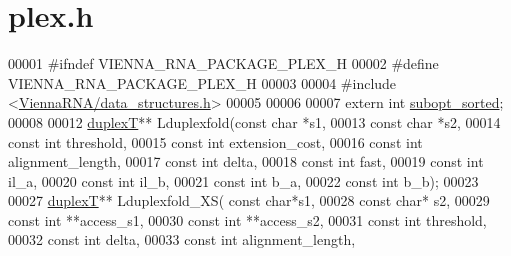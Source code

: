\hypertarget{plex_8h_source}{}\section{plex.\+h}
\label{plex_8h_source}

\begin{DoxyCode}
00001 \textcolor{preprocessor}{#ifndef VIENNA\_RNA\_PACKAGE\_PLEX\_H}
00002 \textcolor{preprocessor}{#define VIENNA\_RNA\_PACKAGE\_PLEX\_H}
00003 
00004 \textcolor{preprocessor}{#include <\hyperlink{data__structures_8h}{ViennaRNA/data\_structures.h}>}
00005 
00006 
00007 \textcolor{keyword}{extern} \textcolor{keywordtype}{int} \hyperlink{group__subopt__wuchty_ga873cf8ed69e0437f8efa8b1fec854a0e}{subopt\_sorted};
00008 
00012 \hyperlink{group__data__structures_structduplexT}{duplexT}** Lduplexfold(\textcolor{keyword}{const} \textcolor{keywordtype}{char} *s1,
00013                       \textcolor{keyword}{const} \textcolor{keywordtype}{char} *s2,
00014                       \textcolor{keyword}{const} \textcolor{keywordtype}{int} threshold,
00015                       \textcolor{keyword}{const} \textcolor{keywordtype}{int} extension\_cost,
00016                       \textcolor{keyword}{const} \textcolor{keywordtype}{int} alignment\_length,
00017                       \textcolor{keyword}{const} \textcolor{keywordtype}{int} delta,
00018                       \textcolor{keyword}{const} \textcolor{keywordtype}{int} fast,
00019                       \textcolor{keyword}{const} \textcolor{keywordtype}{int} il\_a,
00020                       \textcolor{keyword}{const} \textcolor{keywordtype}{int} il\_b,
00021                       \textcolor{keyword}{const} \textcolor{keywordtype}{int} b\_a,
00022                       \textcolor{keyword}{const} \textcolor{keywordtype}{int} b\_b);
00023 
00027 \hyperlink{group__data__structures_structduplexT}{duplexT}** Lduplexfold\_XS( \textcolor{keyword}{const} \textcolor{keywordtype}{char}*s1,
00028                           \textcolor{keyword}{const} \textcolor{keywordtype}{char}* s2,
00029                           \textcolor{keyword}{const} \textcolor{keywordtype}{int} **access\_s1,
00030                           \textcolor{keyword}{const} \textcolor{keywordtype}{int} **access\_s2,
00031                           \textcolor{keyword}{const} \textcolor{keywordtype}{int} threshold,
00032                           \textcolor{keyword}{const} \textcolor{keywordtype}{int} delta,
00033                           \textcolor{keyword}{const} \textcolor{keywordtype}{int} alignment\_length,

\end{DoxyCode}
